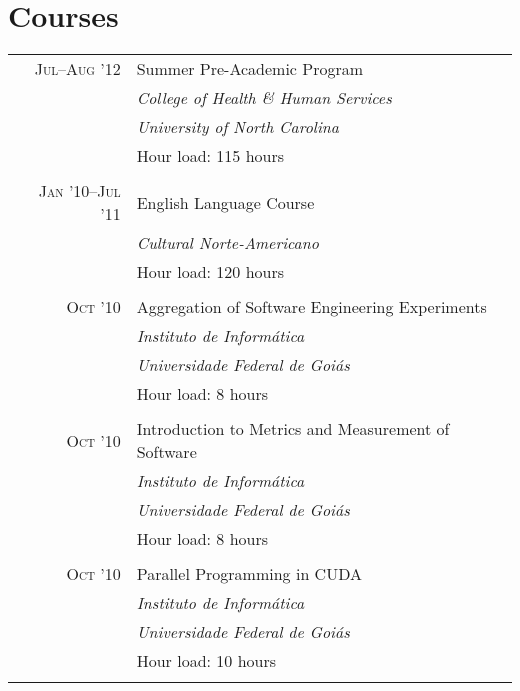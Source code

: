\documentclass[a4paper,10pt]{article}
\begin{document}
\section{Courses}
\begin{tabular}{r|p{11cm}}

  \textsc{Jul--Aug '12} & Summer Pre-Academic Program\\ &
  \emph{College of Health \& Human Services}\\ &
  \emph{University of North Carolina}\\ &
  Hour load: 115 hours
  \\\multicolumn{2}{c}{} \\

  \textsc{Jan '10--Jul '11} & English Language Course\\ &
  \emph{Cultural Norte-Americano} \\ &
  Hour load: 120 hours
  \\\multicolumn{2}{c}{} \\

  \textsc{Oct '10} & Aggregation of Software Engineering Experiments\\ &
  \emph{Instituto de Informática} \\ &
  \emph{Universidade Federal de Goiás}\\ &
  Hour load: 8 hours
  \\\multicolumn{2}{c}{} \\

  \textsc{Oct '10} & Introduction to Metrics and Measurement of Software\\ &
  \emph{Instituto de Informática} \\ &
  \emph{Universidade Federal de Goiás}\\ &
  Hour load: 8 hours
  \\\multicolumn{2}{c}{} \\

  \textsc{Oct '10} & Parallel Programming in CUDA\\ &
  \emph{Instituto de Informática} \\ &
  \emph{Universidade Federal de Goiás}\\ &
  Hour load: 10 hours
  \\\multicolumn{2}{c}{} \\

\end{tabular}
\end{document}
